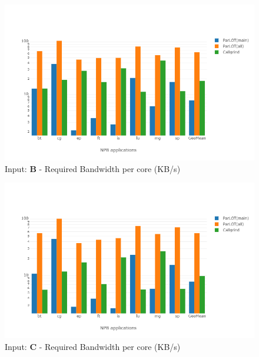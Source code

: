 \begin{figure}[!t]
\centering
\includegraphics[width=6in]{figs.comet/comet_chartAvg_bw_B_p3_5.png}
\caption{ Input: \textbf{B} - Required Bandwidth per core (KB/s)
}
\label{comet_chartAvg_bw_B_p3_5}
\end{figure}

\begin{figure}[!t]
\centering
\includegraphics[width=6in]{figs.comet/comet_chartAvg_bw_C_p3_5.png}
\caption{ Input: \textbf{C}  - Required Bandwidth per core (KB/s)
}
\label{comet_chartAvg_bw_C_p3_5}
\end{figure}










